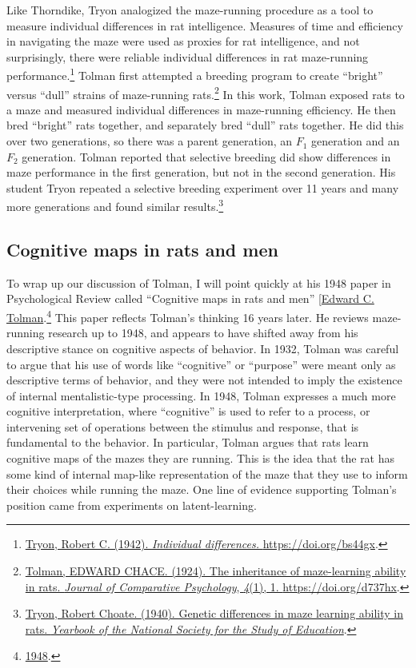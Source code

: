\documentclass[
  oneside,
  12pt]{crumpbook}
\begin{document}
Like Thorndike, Tryon analogized the maze-running procedure as a tool to measure individual differences in rat intelligence. Measures of time and efficiency in navigating the maze were used as proxies for rat intelligence, and not surprisingly, there were reliable individual differences in rat maze-running performance.\footnote{\protect\hyperlink{ref-tryonIndividualDifferences1942}{Tryon, Robert C. (1942). \emph{Individual differences.} \url{https://doi.org/bs44gx}}.} Tolman first attempted a breeding program to create ``bright'' versus ``dull'' strains of maze-running rats.\footnote{\protect\hyperlink{ref-tolmanInheritanceMazelearningAbility1924}{Tolman, EDWARD CHACE. (1924). The inheritance of maze-learning ability in rats. \emph{Journal of Comparative Psychology}, \emph{4}(1), 1. \url{https://doi.org/d737hx}}.} In this work, Tolman exposed rats to a maze and measured individual differences in maze-running efficiency. He then bred ``bright'' rats together, and separately bred ``dull'' rats together. He did this over two generations, so there was a parent generation, an \(F_1\) generation and an \(F_2\) generation. Tolman reported that selective breeding did show differences in maze performance in the first generation, but not in the second generation. His student Tryon repeated a selective breeding experiment over 11 years and many more generations and found similar results.\footnote{\protect\hyperlink{ref-tryonGeneticDifferencesMaze1940}{Tryon, Robert Choate. (1940). Genetic differences in maze learning ability in rats. \emph{Yearbook of the National Society for the Study of Education}}.}

\hypertarget{cognitive-maps-in-rats-and-men}{%
\subsection{Cognitive maps in rats and men}\label{cognitive-maps-in-rats-and-men}}

To wrap up our discussion of Tolman, I will point quickly at his 1948 paper in Psychological Review called ``Cognitive maps in rats and men'' {[}\protect\hyperlink{ref-tolmanCognitiveMapsRats1948}{Edward C. Tolman}.\footnote{\protect\hyperlink{ref-tolmanCognitiveMapsRats1948}{1948}.} This paper reflects Tolman's thinking 16 years later. He reviews maze-running research up to 1948, and appears to have shifted away from his descriptive stance on cognitive aspects of behavior. In 1932, Tolman was careful to argue that his use of words like ``cognitive'' or ``purpose'' were meant only as descriptive terms of behavior, and they were not intended to imply the existence of internal mentalistic-type processing. In 1948, Tolman expresses a much more cognitive interpretation, where ``cognitive'' is used to refer to a process, or intervening set of operations between the stimulus and response, that is fundamental to the behavior. In particular, Tolman argues that rats learn cognitive maps of the mazes they are running. This is the idea that the rat has some kind of internal map-like representation of the maze that they use to inform their choices while running the maze. One line of evidence supporting Tolman's position came from experiments on latent-learning.
\end{document}
